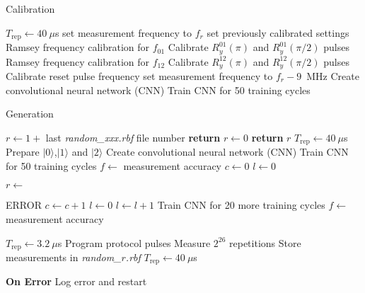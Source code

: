 \documentclass[11pt,a4paper]{article}
\begin{document}
\begin{algorithm}
\caption{Calibration}\label{alg:calibration}
\begin{algorithmic}[1]
\State $T_{\text{rep}} \gets 40~\mu$s
\State set measurement frequency to $f_r$
\State set previously calibrated settings
\State Ramsey frequency calibration for $f_{01}$
\State Calibrate $R^{01}_y(\pi)$ and $R^{01}_y(\pi/2)$ pulses
\State Ramsey frequency calibration for $f_{12}$
\State Calibrate $R^{12}_y(\pi)$ and $R^{12}_y(\pi/2)$ pulses
\State Calibrate reset pulse frequency
\State set measurement frequency to $f_r - 9$~MHz
\State Create convolutional neural network (CNN)
\State Train CNN for 50 training cycles
\EndProcedure
\end{algorithmic}
\end{algorithm}

\begin{algorithm}
\caption{Generation}\label{alg:generation}
\begin{algorithmic}[1]
        \State $r \gets 1+$ last \textit{random\_xxx.rbf} file number
    \Else
        \State \textbf{return} $r \gets 0$
    \EndIf
    \State \textbf{return} $r$
\EndProcedure
\State $T_{\text{rep}} \gets 40~\mu$s
\State Prepare $|0\rangle$,$|1\rangle$ and $|2\rangle$ 
\State Create convolutional neural network (CNN)
\State Train CNN for 50 training cycles
\State $f \gets $ measurement accuracy
\State {}
\State $c \gets 0$ 
\State $l \gets 0$ 

\State $r \gets $

                \State ERROR
            \EndIf
            \State {}
            \State $c \gets c+1$
            \State $l \gets 0$
        \EndIf
        \State $l \gets l+1$
        \State Train CNN for 20 more training cycles
        \State $f \gets $ measurement accuracy
    \EndWhile

    \State $T_{\text{rep}} \gets 3.2~\mu$s
    \State Program protocol pulses
    \State Measure $2^{26}$ repetitions
    \State Store measurements in \textit{random\_$r$.rbf}
    \State $T_{\text{rep}} \gets 40~\mu$s
\EndWhile

\State \textbf{On Error} Log error and restart

\end{algorithmic}
\end{algorithm}
\end{document}
